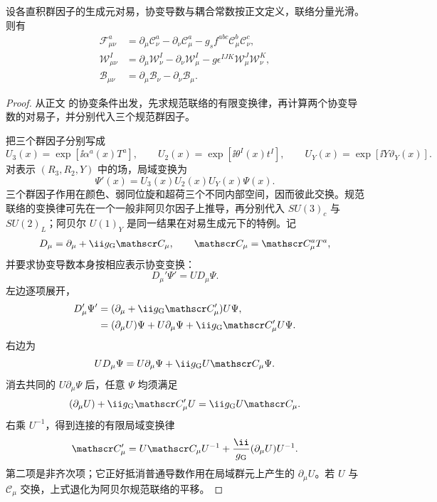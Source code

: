 \begin{proposition}[直积规范联络的曲率]
设各直积群因子的生成元对易，协变导数与耦合常数按正文定义，联络分量光滑。则有
\begin{align}
 \mathcal F_{\mu\nu}^a
 &=\partial_\mu\mathscr C_\nu^a-\partial_\nu\mathscr C_\mu^a
 -g_sf^{abc}\mathscr C_\mu^b\mathscr C_\nu^c,\\
 \mathcal W_{\mu\nu}^I
 &=\partial_\mu\mathcal W_\nu^I-\partial_\nu\mathcal W_\mu^I
 -g\epsilon^{IJK}\mathcal W_\mu^J\mathcal W_\nu^K,\\
 \mathcal B_{\mu\nu}
 &=\partial_\mu\mathcal B_\nu-\partial_\nu\mathcal B_\mu.
\label{eq:sm-field-strengths-dp11}
\end{align}
\end{proposition}
\begin{proof}
从正文 的协变条件出发，先求规范联络的有限变换律，再计算两个协变导数的对易子，并分别代入三个规范群因子。

把三个群因子分别写成
\begin{equation*}
 U_3(x)=\exp[\ii\alpha^a(x)T^a],\qquad
 U_2(x)=\exp[\ii\theta^I(x)t^I],\qquad
 U_Y(x)=\exp[\ii Y\vartheta_Y(x)].
\end{equation*}
对表示 $(R_3,R_2,Y)$ 中的场，局域变换为
\begin{equation*}
 \Psi'(x)=U_3(x)U_2(x)U_Y(x)\Psi(x).
\end{equation*}
三个群因子作用在颜色、弱同位旋和超荷三个不同内部空间，因而彼此交换。规范联络的变换律可先在一个一般非阿贝尔因子上推导，再分别代入 $SU(3)_c$ 与 $SU(2)_L$；阿贝尔 $U(1)_Y$ 是同一结果在对易生成元下的特例。记
\begin{equation*}
 D_\mu=\partial_\mu+\ii g_{\rm G}\mathscr C_\mu,
 \qquad \mathscr C_\mu=\mathscr C_\mu^aT^a,
\end{equation*}
并要求协变导数本身按相应表示协变变换：
\begin{equation*}
 D_\mu'\Psi'=U D_\mu\Psi.
\end{equation*}
左边逐项展开，
\begin{align*}
 D_\mu'\Psi'
 &=(\partial_\mu+\ii g_{\rm G}\mathscr C_\mu')U\Psi,\\
 &=(\partial_\mu U)\Psi+U\partial_\mu\Psi
   +\ii g_{\rm G}\mathscr C_\mu'U\Psi.
\end{align*}
右边为
\begin{equation*}
 U D_\mu\Psi
 =U\partial_\mu\Psi+\ii g_{\rm G}U\mathscr C_\mu\Psi.
\end{equation*}
消去共同的 $U\partial_\mu\Psi$ 后，任意 $\Psi$ 均须满足
\begin{equation*}
 (\partial_\mu U)+\ii g_{\rm G}\mathscr C_\mu'U
 =\ii g_{\rm G}U\mathscr C_\mu.
\end{equation*}
右乘 $U^{-1}$，得到连接的有限局域变换律
\begin{equation*}
 {
 \mathscr C_\mu'
 =U\mathscr C_\mu U^{-1}
 +\frac{\ii}{g_{\rm G}}(\partial_\mu U)U^{-1}.}
\end{equation*}
第二项是非齐次项；它正好抵消普通导数作用在局域群元上产生的 $\partial_\mu U$。若 $U$ 与 $\mathscr C_\mu$ 交换，上式退化为阿贝尔规范联络的平移。


\end{proof}

